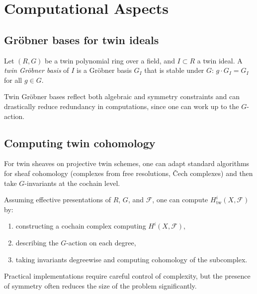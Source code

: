\documentclass[11pt,a4paper]{article}
\numberwithin{equation}{section}
\newcommand{\Fcal}{\mathcal{F}}
\begin{document}
	\section{Computational Aspects}
	\label{sec:computational}
	
	\subsection{Gr\"obner bases for twin ideals}
	
	\begin{definition}
		Let $(R,G)$ be a twin polynomial ring over a field, and $I\subset R$ a twin ideal.
		A \emph{twin Gr\"obner basis} of $I$ is a Gr\"obner basis $G_I$ that is stable under $G$:
		$g\cdot G_I=G_I$ for all $g\in G$.
	\end{definition}
	
	\begin{remark}
		Twin Gr\"obner bases reflect both algebraic and symmetry constraints and can drastically 
		reduce redundancy in computations, since one can work up to the $G$-action.
	\end{remark}
	
	\subsection{Computing twin cohomology}
	
	For twin sheaves on projective twin schemes, one can adapt standard algorithms for sheaf cohomology
	(complexes from free resolutions, \v{C}ech complexes) and then take $G$-invariants at the cochain level.
	
	\begin{proposition}
		Assuming effective presentations of $R$, $G$, and $\Fcal$, one can compute 
		$H^i_{\mathrm{tw}}(X,\Fcal)$ by:
		\begin{enumerate}[label=(\roman*)]
			\item constructing a cochain complex computing $H^i(X,\Fcal)$,
			\item describing the $G$-action on each degree,
			\item taking invariants degreewise and computing cohomology of the subcomplex.
		\end{enumerate}
	\end{proposition}
	
	\begin{remark}
		Practical implementations require careful control of complexity, but the presence of symmetry
		often reduces the size of the problem significantly.
	\end{remark}
	
\end{document}
